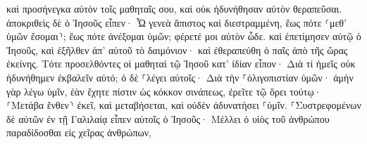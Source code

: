\documentclass{openreader}
\begin{document}
καὶ προσήνεγκα αὐτὸν τοῖς μαθηταῖς σου, καὶ οὐκ ἠδυνήθησαν αὐτὸν θεραπεῦσαι. 
ἀποκριθεὶς δὲ ὁ Ἰησοῦς εἶπεν· Ὦ γενεὰ ἄπιστος καὶ διεστραμμένη, ἕως πότε ⸂μεθ’ ὑμῶν ἔσομαι⸃; ἕως πότε ἀνέξομαι ὑμῶν; φέρετέ μοι αὐτὸν ὧδε. 
καὶ ἐπετίμησεν αὐτῷ ὁ Ἰησοῦς, καὶ ἐξῆλθεν ἀπ’ αὐτοῦ τὸ δαιμόνιον· καὶ ἐθεραπεύθη ὁ παῖς ἀπὸ τῆς ὥρας ἐκείνης. 
Τότε προσελθόντες οἱ μαθηταὶ τῷ Ἰησοῦ κατ’ ἰδίαν εἶπον· Διὰ τί ἡμεῖς οὐκ ἠδυνήθημεν ἐκβαλεῖν αὐτό; 
ὁ δὲ ⸀λέγει αὐτοῖς· Διὰ τὴν ⸀ὀλιγοπιστίαν ὑμῶν· ἀμὴν γὰρ λέγω ὑμῖν, ἐὰν ἔχητε πίστιν ὡς κόκκον σινάπεως, ἐρεῖτε τῷ ὄρει τούτῳ· ⸂Μετάβα ἔνθεν⸃ ἐκεῖ, καὶ μεταβήσεται, καὶ οὐδὲν ἀδυνατήσει ⸀ὑμῖν. 
⸀Συστρεφομένων δὲ αὐτῶν ἐν τῇ Γαλιλαίᾳ εἶπεν αὐτοῖς ὁ Ἰησοῦς· Μέλλει ὁ υἱὸς τοῦ ἀνθρώπου παραδίδοσθαι εἰς χεῖρας ἀνθρώπων, 
\end{document}
